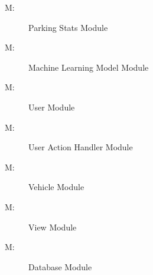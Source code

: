 \documentclass[12pt, titlepage]{article}
\newcounter{mnum}
\newcommand{\mthemnum}{M\themnum}
\begin{document}
\begin{description}
\item [ \mthemnum \label{mParkingStats}:] Parking Stats
Module
\end{description}

\begin{description}
\item [ \mthemnum \label{mMachineLearningModel}:] Machine
Learning Model Module
\end{description}

\begin{description}
\item [ \mthemnum \label{mUser}:] User Module
\end{description}

\begin{description}
\item [ \mthemnum \label{mUserActionHandler}:] User Action
Handler Module
\end{description}

\begin{description}
\item [ \mthemnum \label{mVehicle}:] Vehicle Module
\end{description}

\begin{description}
\item [ \mthemnum \label{mView}:] View Module
\end{description}

\color{red} {
\begin{description}
\item [ \mthemnum \label{mDb}:]Database Module
\end{description}
}
\end{document}
